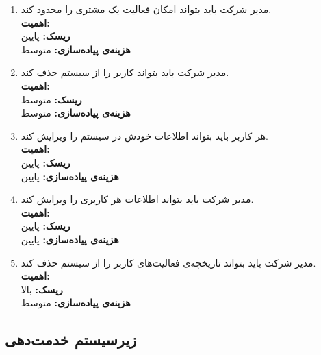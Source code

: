 \begin{enumerate}
\item 
مدیر شرکت باید بتواند امکان فعالیت یک مشتری را محدود کند.
\\
\textbf{اهمیت:} 
\\
\textbf{ریسک:} پایین
\\
\textbf{هزینه‌ی پیاده‌سازی:} متوسط
\item 
مدیر شرکت باید بتواند کاربر را از سیستم حذف کند.
\\
\textbf{اهمیت:} 
\\
\textbf{ریسک:} متوسط
\\
\textbf{هزینه‌ی پیاده‌سازی:} متوسط

\item 
هر کاربر باید بتواند اطلاعات خودش در سیستم را ویرایش کند.
 \\
\textbf{اهمیت:} 
\\
\textbf{ریسک:} پایین
\\
\textbf{هزینه‌ی پیاده‌سازی:} پایین
\item 
مدیر شرکت باید بتواند اطلاعات هر کاربری را ویرایش کند.
 \\
\textbf{اهمیت:} 
\\
\textbf{ریسک:} پایین
\\
\textbf{هزینه‌ی پیاده‌سازی:} پایین

\item 
مدیر شرکت باید بتواند تاریخچه‌ی فعالیت‌های کاربر را از سیستم حذف کند.
\\
\textbf{اهمیت:} 
\\
\textbf{ریسک:} بالا
\\
\textbf{هزینه‌ی پیاده‌سازی:} متوسط


\end{enumerate}


\subsection{زیرسیستم خدمت‌دهی}


